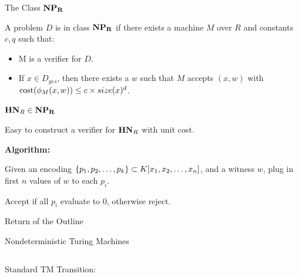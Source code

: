 \documentclass[c]{beamer}
\begin{document}
\begin{frame}{The Class $\mathbf{NP_R}$}

  A problem $D$ is in class $\mathbf{NP_R}$ if there exists a machine $M$ over
  $R$ and constants $c, q$ such that:

  \begin{itemize}
    \item M is a verifier for $D$.
    \item If $x \in D_{yes}$, then there exists a $w$ such that $M$
      accepts $(x, w)$ with $\text{cost}(\phi_M(x, w)) \leq c \times
      size(x)^d$.
    \end{itemize}
  
\end{frame}

\begin{frame}{$\mathbf{HN}_R \in \mathbf{NP_R}$}

  Easy to construct a verifier for $\mathbf{HN}_R$ with unit cost.

  \vspace{\baselineskip}

  \textbf{Algorithm:}

  Given an encoding $\{p_1, p_2, \ldots, p_k\} \subset K[x_1, x_2,\ldots,x_n]$,
  and a witness $w$, plug in first $n$ values of $w$ to each $p_i$.

  \vspace{\baselineskip}

  Accept if all $p_i$ evaluate to $0$, otherwise reject.

\end{frame}

\begin{frame}{Return of the Outline}
  \begin{center}
    \scaletopagewidth{\outlinefinal}
  \end{center}
\end{frame}

\begin{frame}{Nondeterministic Turing Machines}

  \begin{columns}

    Standard TM Transition:
       

    \begin{center}
      \detercomptm{}
    \end{center}
  \end{columns}
\end{frame}
\end{document}

